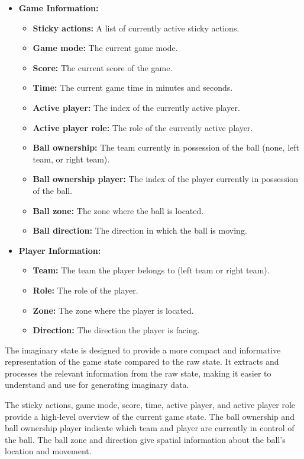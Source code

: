 \begin{itemize}[leftmargin=*]
\item \textbf{Game Information:}
\begin{itemize}
\item \textbf{Sticky actions:} A list of currently active sticky actions.
\item \textbf{Game mode:} The current game mode.
\item \textbf{Score:} The current score of the game.
\item \textbf{Time:} The current game time in minutes and seconds.
\item \textbf{Active player:} The index of the currently active player.
\item \textbf{Active player role:} The role of the currently active player.
\item \textbf{Ball ownership:} The team currently in possession of the ball (none, left team, or right team).
\item \textbf{Ball ownership player:} The index of the player currently in possession of the ball.
\item \textbf{Ball zone:} The zone where the ball is located.
\item \textbf{Ball direction:} The direction in which the ball is moving.
\end{itemize}

\item \textbf{Player Information:}
\begin{itemize}
\item \textbf{Team:} The team the player belongs to (left team or right team).
\item \textbf{Role:} The role of the player.
\item \textbf{Zone:} The zone where the player is located.
\item \textbf{Direction:} The direction the player is facing.
\end{itemize}
\end{itemize}


The imaginary state is designed to provide a more compact and informative representation of the game state compared to the raw state. It extracts and processes the relevant information from the raw state, making it easier to understand and use for generating imaginary data.

The sticky actions, game mode, score, time, active player, and active player role provide a high-level overview of the current game state. The ball ownership and ball ownership player indicate which team and player are currently in control of the ball. The ball zone and direction give spatial information about the ball's location and movement.

